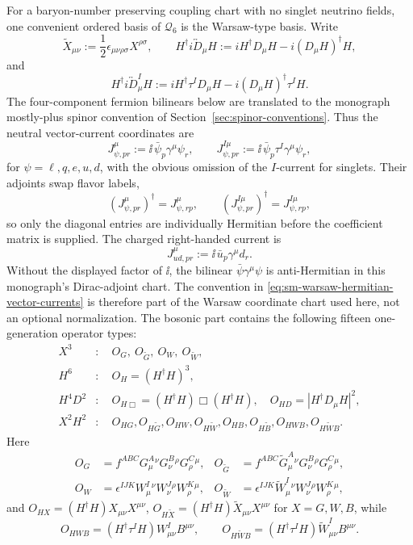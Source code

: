 \begin{definition}
\label{def:sm-warsaw-type-dimension-six-basis}
For a baryon-number preserving coupling chart with no singlet neutrino fields,
one convenient ordered basis of \(\mathcal Q_6\) is the Warsaw-type basis.
Write
\[
  \widetilde X_{\mu\nu}:=
  \frac12\epsilon_{\mu\nu\rho\sigma}X^{\rho\sigma},
  \qquad
  H^\dagger i\overleftrightarrow D_\mu H
  :=
  iH^\dagger D_\mu H-i(D_\mu H)^\dagger H,
\]
and
\[
  H^\dagger i\overleftrightarrow D_\mu^I H
  :=
  iH^\dagger\tau^I D_\mu H-i(D_\mu H)^\dagger\tau^I H .
\]
The four-component fermion bilinears below are translated to the monograph
mostly-plus spinor convention of Section~\ref{sec:spinor-conventions}.  Thus
the neutral vector-current coordinates are
\begin{equation}
  J_{\psi,pr}^{\mu}:=\ii\,\bar\psi_p\gamma^\mu\psi_r,
  \qquad
  J_{\psi,pr}^{I\mu}:=\ii\,\bar\psi_p\tau^I\gamma^\mu\psi_r,
  \label{eq:sm-warsaw-hermitian-vector-currents}
\end{equation}
for \(\psi=\ell,q,e,u,d\), with the obvious omission of the \(I\)-current for
singlets.  Their adjoints swap flavor labels,
\[
  (J_{\psi,pr}^{\mu})^\dagger=J_{\psi,rp}^{\mu},
  \qquad
  (J_{\psi,pr}^{I\mu})^\dagger=J_{\psi,rp}^{I\mu},
\]
so only the diagonal entries are individually Hermitian before the coefficient
matrix is supplied.  The charged right-handed current is
\[
  J_{ud,pr}^{\mu}:=\ii\,\bar u_p\gamma^\mu d_r .
\]
Without the displayed factor of \(\ii\), the bilinear
\(\bar\psi\gamma^\mu\psi\) is anti-Hermitian in this monograph's Dirac-adjoint
chart.  The convention in \eqref{eq:sm-warsaw-hermitian-vector-currents} is
therefore part of the Warsaw coordinate chart used here, not an optional
normalization.
The bosonic part contains the following fifteen one-generation operator
types:
\[
\begin{aligned}
X^3&:\quad
  O_G,\ O_{\widetilde G},\ O_W,\ O_{\widetilde W},\\
H^6&:\quad
  O_H=(H^\dagger H)^3,\\
H^4D^2&:\quad
  O_{H\Box}=(H^\dagger H)\Box(H^\dagger H),\quad
  O_{HD}=|H^\dagger D_\mu H|^2,\\
X^2H^2&:\quad
  O_{HG},O_{H\widetilde G},O_{HW},O_{H\widetilde W},
  O_{HB},O_{H\widetilde B},O_{HWB},O_{H\widetilde WB}.
\end{aligned}
\]
Here
\[
\begin{aligned}
  O_G&=f^{ABC}G^A_{\mu}{}^{\nu}G^B_{\nu}{}^{\rho}
      G^C_{\rho}{}^{\mu},&
  O_{\widetilde G}&=f^{ABC}\widetilde G^A_{\mu}{}^{\nu}
      G^B_{\nu}{}^{\rho}G^C_{\rho}{}^{\mu},\\
  O_W&=\epsilon^{IJK}W^I_{\mu}{}^{\nu}W^J_{\nu}{}^{\rho}
      W^K_{\rho}{}^{\mu},&
  O_{\widetilde W}&=\epsilon^{IJK}\widetilde W^I_{\mu}{}^{\nu}
      W^J_{\nu}{}^{\rho}W^K_{\rho}{}^{\mu},
\end{aligned}
\]
and \(O_{HX}=(H^\dagger H)X_{\mu\nu}X^{\mu\nu}\),
\(O_{H\widetilde X}=(H^\dagger H)\widetilde X_{\mu\nu}X^{\mu\nu}\)
for \(X=G,W,B\), while
\[
  O_{HWB}=(H^\dagger\tau^I H)W^I_{\mu\nu}B^{\mu\nu},
  \qquad
  O_{H\widetilde WB}=(H^\dagger\tau^I H)\widetilde W^I_{\mu\nu}B^{\mu\nu}.
\]


\end{definition}
